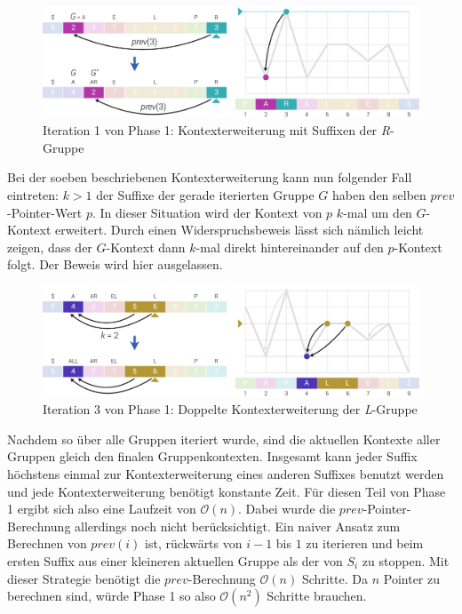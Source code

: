 \documentclass[twoside,a4paper,11pt]{article}
\theoremstyle{break}
\begin{document}
\begin{figure}[h]
	\centering
	\includegraphics[width=\linewidth,bb=0 0 1310 386]{./assets/phase1-R.pdf}
	\caption{Iteration 1 von Phase 1: Kontexterweiterung mit Suffixen der \textit{R}-Gruppe}
\label{fig:phase1-R}
\end{figure}

Bei der soeben beschriebenen Kontexterweiterung kann nun folgender Fall eintreten: $k > 1$ der Suffixe der gerade iterierten Gruppe $G$ haben den selben $prev$-Pointer-Wert $p$. In dieser Situation wird der Kontext von $p$ $k$-mal um den $G$-Kontext erweitert. Durch einen Widerspruchsbeweis lässt sich nämlich leicht zeigen, dass der $G$-Kontext dann $k$-mal direkt hintereinander auf den $p$-Kontext folgt. Der Beweis wird hier ausgelassen.

\begin{figure}[h]
	\centering
	\includegraphics[width=\linewidth,bb=0 0 1310 386]{./assets/phase1-L.pdf}
	\caption{Iteration 3 von Phase 1: Doppelte Kontexterweiterung der \textit{L}-Gruppe}
\label{fig:phase1-L}
\end{figure}

Nachdem so über alle Gruppen iteriert wurde, sind die aktuellen Kontexte aller Gruppen gleich den finalen Gruppenkontexten. Insgesamt kann jeder Suffix höchstens einmal zur Kontexterweiterung eines anderen Suffixes benutzt werden und jede Kontexterweiterung benötigt konstante Zeit. Für diesen Teil von Phase 1 ergibt sich also eine Laufzeit von $\mathcal{O}(n)$. Dabei wurde die $prev$-Pointer-Berechnung allerdings noch nicht berücksichtigt. Ein naiver Ansatz zum Berechnen von $prev(i)$ ist, rückwärts von $i - 1$ bis $1$ zu iterieren und beim ersten Suffix aus einer kleineren aktuellen Gruppe als der von $S_i$ zu stoppen. Mit dieser Strategie benötigt die $prev$-Berechnung $\mathcal{O}(n)$ Schritte. Da $n$ Pointer zu berechnen sind, würde Phase 1 so also $\mathcal{O}(n^2)$ Schritte brauchen.\\
\end{document}
